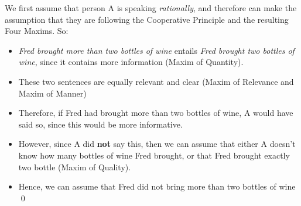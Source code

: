 \documentclass[11pt]{article}
\begin{document}
\begin{solution}
We first assume that person A is speaking \textit{rationally}, and therefore can make the assumption that they are following the Cooperative Principle and the resulting Four Maxims. So:

\begin{itemize}
    \item \textit{Fred brought more than two bottles of wine} entails \textit{Fred brought two bottles of wine}, since it contains more information (Maxim of Quantity).

    \item These two sentences are equally relevant and clear (Maxim of Relevance and Maxim of Manner)

    \item Therefore, if Fred had brought more than two bottles of wine, A would have said so, since this would be more informative.

    \item However, since A did \textbf{not} say this, then we can assume that either A doesn't know how many bottles of wine Fred brought, or that Fred brought exactly two bottle (Maxim of Quality).

    \item Hence, we can assume that Fred did not bring more than two bottles of wine \qed

\end{itemize}

\end{solution}

\vspace*{0.5cm}
\newpage
\end{document}
